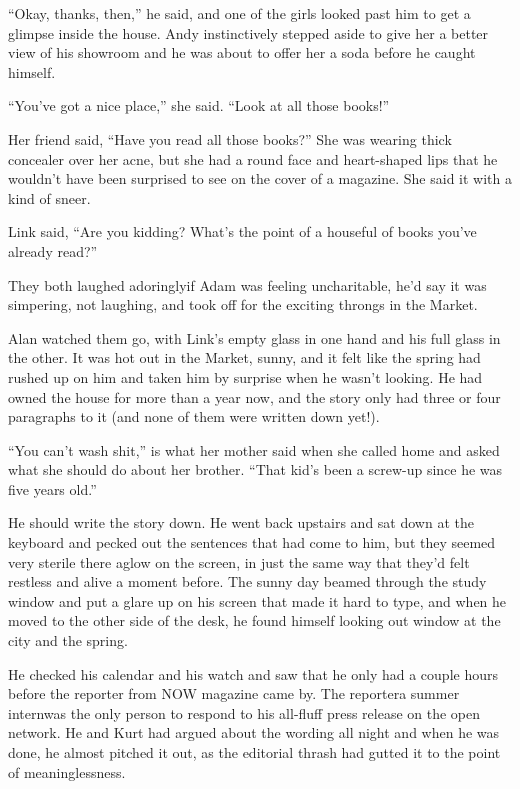 ``Okay, thanks, then,'' he said, and one of the girls looked past him
to get a glimpse inside the house.  Andy instinctively stepped aside
to give her a better view of his showroom and he was about to offer
her a soda before he caught himself.

``You've got a nice place,'' she said.  ``Look at all those books!''

Her friend said, ``Have you read all those books?'' She was wearing
thick concealer over her acne, but she had a round face and
heart-shaped lips that he wouldn't have been surprised to see on the
cover of a magazine.  She said it with a kind of sneer.

Link said, ``Are you kidding?  What's the point of a houseful of books
you've already read?''

They both laughed adoringly\dash{}if Adam was feeling uncharitable, he'd
say it was simpering, not laughing, and took off for the exciting
throngs in the Market.

Alan watched them go, with Link's empty glass in one hand and his full
glass in the other.  It was hot out in the Market, sunny, and it felt
like the spring had rushed up on him and taken him by surprise when he
wasn't looking.  He had owned the house for more than a year now, and
the story only had three or four paragraphs to it (and none of them
were written down yet!).

``You can't wash shit,'' is what her mother said when she called home
and asked what she should do about her brother.  ``That kid's been a
screw-up since he was five years old.''

He should write the story down.  He went back upstairs and sat down at
the keyboard and pecked out the sentences that had come to him, but
they seemed very sterile there aglow on the screen, in just the same
way that they'd felt restless and alive a moment before.  The sunny
day beamed through the study window and put a glare up on his screen
that made it hard to type, and when he moved to the other side of the
desk, he found himself looking out window at the city and the spring.

He checked his calendar and his watch and saw that he only had a
couple hours before the reporter from NOW magazine came by.  The
reporter\dash{}a summer intern\dash{}was the only person to respond to his
all-fluff press release on the open network.  He and Kurt had argued
about the wording all night and when he was done, he almost pitched it
out, as the editorial thrash had gutted it to the point of
meaninglessness.

